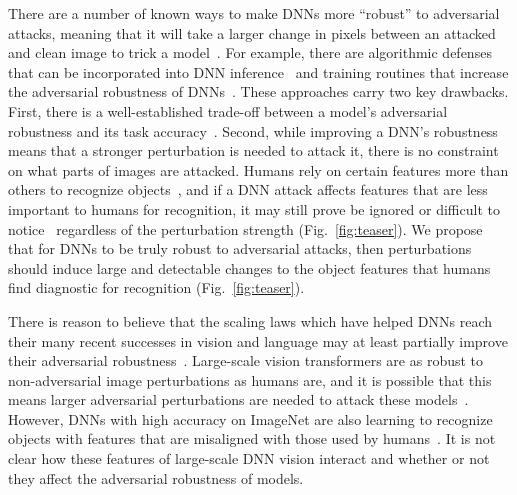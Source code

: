 \documentclass{article}
\theoremstyle{plain}
\theoremstyle{definition}
\theoremstyle{remark}
\begin{document}
There are a number of known ways to make DNNs more ``robust'' to adversarial attacks, meaning that it will take a larger change in pixels between an attacked and clean image to trick a model~\cite{kurakin2018adversarial}. For example, there are algorithmic defenses that can be incorporated into DNN inference~\cite{cohen2019certified} and training routines that increase the adversarial robustness of DNNs~\cite{PGD_madrytowards, trades_zhang2019theoretically,cisse2017parseval}. These approaches carry two key drawbacks. First, there is a well-established trade-off between a model's adversarial robustness and its task accuracy~\cite{yang2020closer,stutz2019disentangling}. Second, while improving a DNN's robustness means that a stronger perturbation is needed to attack it, there is no constraint on what parts of images are attacked. Humans rely on certain features more than others to recognize objects~\cite{Fel2022-dt,Linsley2019-xi,Schyns1994-ox,Ullman2016-wy}, and if a DNN attack affects features that are less important to humans for recognition, it may still prove be ignored or difficult to notice~\cite{Malhotra2020-kj} regardless of the perturbation strength (Fig.~\ref{fig:teaser}). We propose that for DNNs to be truly robust to adversarial attacks, then perturbations should induce large and detectable changes to the object features that humans find diagnostic for recognition (Fig.~\ref{fig:teaser}).

There is reason to believe that the scaling laws which have helped DNNs reach their many recent successes in vision and language may at least partially improve their adversarial robustness~\cite{bubeck2023universal}. Large-scale vision transformers are as robust to non-adversarial image perturbations as humans are, and it is possible that this means larger adversarial perturbations are needed to attack these models~\cite{Dehghani2023-zw,Geirhos2021-rr}. However, DNNs with high accuracy on ImageNet are also learning to recognize objects with features that are misaligned with those used by humans~\cite{Fel2022-dt}. It is not clear how these features of large-scale DNN vision interact and whether or not they affect the adversarial robustness of models.
\end{document}
